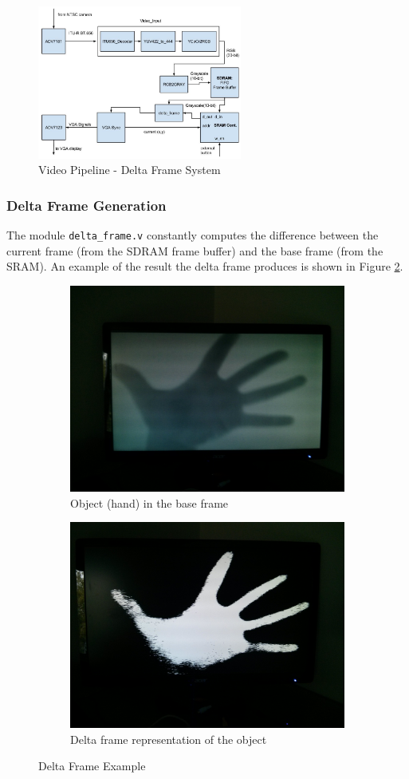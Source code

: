 \documentclass[11pt]{article} %
\begin{document}
\begin{figure}[h]
\centering
\includegraphics[width=0.6\textwidth]{./images/new_pipeline_2.jpg}
\caption{Video Pipeline - Delta Frame System}
\label{fig:pipe2}
\end{figure}
\subsubsection{Delta Frame Generation}
The module \texttt{delta\_frame.v} constantly computes the difference between the current frame (from the SDRAM frame buffer) and the base frame (from the SRAM). An example of the result the delta frame produces is shown in Figure \ref{fig:delta}.
\begin{figure}
\centering
\begin{subfigure}{.5\textwidth}
  \centering
  \includegraphics[width=.6\linewidth]{./images/delta_frame_1}
  \caption{Object (hand) in the base frame}
\end{subfigure}%
\begin{subfigure}{.5\textwidth}
  \centering
  \includegraphics[width=.6\linewidth]{./images/delta_frame_2}
  \caption{Delta frame representation of the object}
\end{subfigure}
\caption{Delta Frame Example}
\label{fig:delta}
\end{figure}
\end{document}
